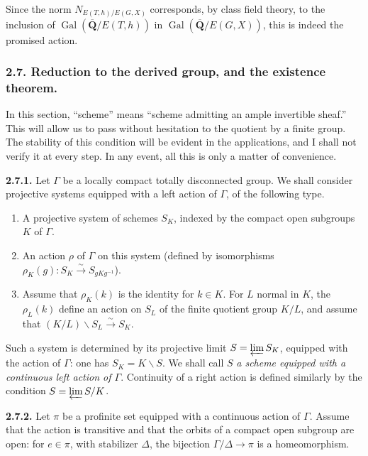 \documentclass[10pt,a4paper]{article}
\begin{document}
Since the norm \(N_{E(T,h)/E(G,X)}\) corresponds, by class field theory, to the inclusion of \(\operatorname{Gal}(\overline{\mathbf Q}/E(T,h))\) in \(\operatorname{Gal}(\overline{\mathbf Q}/E(G,X))\), this is indeed the promised action.

\subsubsection{2.7. Reduction to the derived group, and the existence theorem.}

In this section, ``scheme'' means ``scheme admitting an ample invertible sheaf.'' This will allow us to pass without hesitation to the quotient by a finite group. The stability of this condition will be evident in the applications, and I shall not verify it at every step. In any event, all this is only a matter of convenience.

\textbf{2.7.1.} Let \(\Gamma\) be a locally compact totally disconnected group. We shall consider projective systems equipped with a left action of \(\Gamma\), of the following type.

\begin{enumerate}
\def\labelenumi{(\alph{enumi})}
\item
  A projective system of schemes \(S_K\), indexed by the compact open subgroups \(K\) of \(\Gamma\).
\item
  An action \(\rho\) of \(\Gamma\) on this system (defined by isomorphisms \(\rho_K(g):S_K\xrightarrow{\sim}S_{gKg^{-1}}\)).
\item
  Assume that \(\rho_K(k)\) is the identity for \(k\in K\). For \(L\) normal in \(K\), the \(\rho_L(k)\) define an action on \(S_L\) of the finite quotient group \(K/L\), and assume that \((K/L)\backslash S_L\xrightarrow{\sim}S_K\).
\end{enumerate}

Such a system is determined by its projective limit \(S=\varprojlim S_K\), equipped with the action of \(\Gamma\): one has \(S_K=K\backslash S\). We shall call \(S\) \emph{a scheme equipped with a continuous left action of \(\Gamma\)}. Continuity of a right action is defined similarly by the condition \(S=\varprojlim S/K\).

\textbf{2.7.2.} Let \(\pi\) be a profinite set equipped with a continuous action of \(\Gamma\). Assume that the action is transitive and that the orbits of a compact open subgroup are open: for \(e\in\pi\), with stabilizer \(\Delta\), the bijection \(\Gamma/\Delta\to\pi\) is a homeomorphism.
\end{document}
